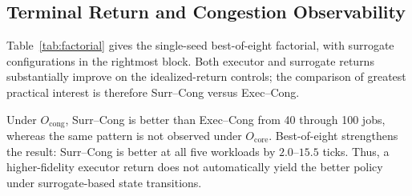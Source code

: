 \subsection{Terminal Return and Congestion Observability}

Table~\ref{tab:factorial} gives the single-seed best-of-eight factorial, with
surrogate configurations in the rightmost block. Both executor and surrogate
returns substantially improve on the idealized-return controls; the comparison
of greatest practical interest is therefore Surr--Cong versus Exec--Cong.

\begin{table}[!ht]
\caption{Best-of-eight factorial results.}
\label{tab:factorial}
\centering
\scriptsize
\setlength{\tabcolsep}{1.8pt}
\end{table}

Under $O_{\mathrm{cong}}$, Surr--Cong is better than Exec--Cong from 40
through 100 jobs, whereas the same pattern is not observed under
$O_{\mathrm{core}}$. Best-of-eight strengthens the result: Surr--Cong is
better at all five workloads by $2.0$--$15.5$ ticks. Thus, a higher-fidelity
executor return does not automatically yield the better policy under
surrogate-based state transitions.

